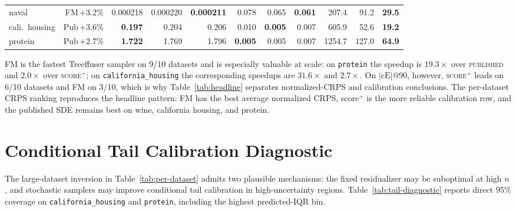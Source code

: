 \documentclass{uai2026}
\begin{document}
\begin{table}[!h]
\begin{tabular}{lrrrrrrrrrr}
    naval              & FM\,$+$3.2\%      & 0.000218 & 0.000220 & \textbf{0.000211} & 0.078 & 0.065 & \textbf{0.061} & 207.4 & 91.2 & \textbf{29.5} \\
    cali.\ housing     & Pub\,$+$3.6\%     & \textbf{0.197} & 0.204 & 0.206 & 0.010 & \textbf{0.005} & 0.007 & 605.9 & 52.6 & \textbf{19.2} \\
    protein            & Pub\,$+$2.7\%     & \textbf{1.722} & 1.769 & 1.796 & \textbf{0.005} & 0.005 & 0.007 & 1254.7 & 127.0 & \textbf{64.9} \\
    \bottomrule
  \end{tabular}
\end{table}

FM is the fastest Treeffuser sampler on 9/10 datasets and is especially valuable at scale: on \texttt{protein} the speedup is $19.3\times$ over \textsc{published} and $2.0\times$ over \textsc{score$^+$}; on \texttt{california\_housing} the corresponding speedups are $31.6\times$ and $2.7\times$. On $|\text{cE}|$@90, however, \textsc{score$^+$} leads on 6/10 datasets and FM on 3/10, which is why Table~\ref{tab:headline} separates normalized-CRPS and calibration conclusions. The per-dataset CRPS ranking reproduces the headline pattern: FM has the best average normalized CRPS, score$^+$ is the more reliable calibration row, and the published SDE remains best on wine, california housing, and protein.

\section{Conditional Tail Calibration Diagnostic}\label{app:tail-diagnostic}

The large-dataset inversion in Table~\ref{tab:per-dataset} admits two plausible mechanisms: the fixed residualizer may be suboptimal at high $n$, and stochastic samplers may improve conditional tail calibration in high-uncertainty regions. Table~\ref{tab:tail-diagnostic} reports direct 95\% coverage on \texttt{california\_housing} and \texttt{protein}, including the highest predicted-IQR bin.
\end{document}
